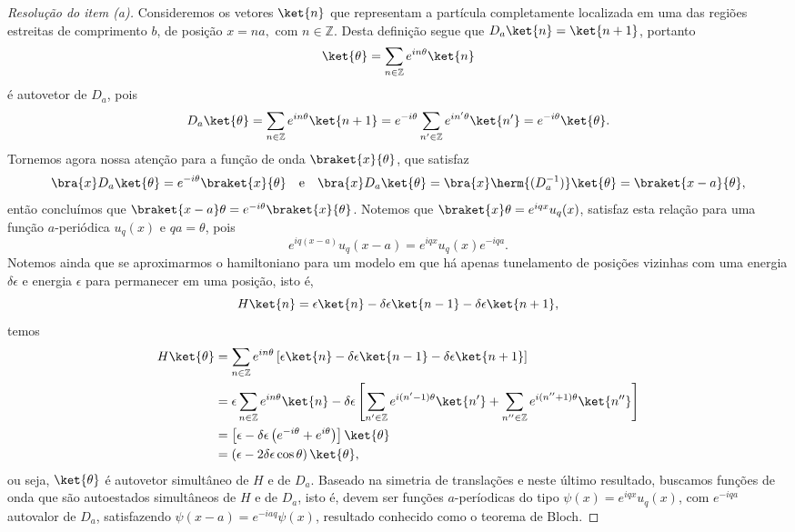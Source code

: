 \begin{proof}[Resolução do item (a)]
    Consideremos os vetores \(\ket{n}\) que representam a partícula completamente localizada em uma das regiões estreitas de comprimento \(b\), de posição \(x = na,\) com \(n \in \mathbb{Z}\). Desta definição segue que \(D_a \ket{n} = \ket{n+1}\), portanto
    \begin{equation*}
        \ket{\theta} = \sum_{n \in \mathbb{Z}} e^{i n \theta} \ket{n}
    \end{equation*}
    é autovetor de \(D_a\), pois
    \begin{equation*}
        D_a \ket{\theta} = \sum_{n \in \mathbb{Z}} e^{i n \theta} \ket{n+1} = e^{-i \theta} \sum_{n' \in \mathbb{Z}} e^{i n'\theta} \ket{n'} = e^{-i\theta} \ket{\theta}.
    \end{equation*}
    Tornemos agora nossa atenção para a função de onda \(\braket{x}{\theta}\), que satisfaz
    \begin{equation*}
        \bra{x}D_a\ket{\theta} = e^{-i\theta} \braket{x}{\theta}\quad\text{e}\quad
        \bra{x}D_a\ket{\theta} = \bra{x}\herm{(D_a^{-1})}\ket{\theta} = \braket{x - a}{\theta},
    \end{equation*}
    então concluímos que \(\braket{x - a}\theta = e^{-i\theta}\braket{x}{\theta}\). Notemos que \(\braket{x}\theta = e^{iqx} u_q(x)\), satisfaz esta relação para uma função \(a\)-periódica \(u_q(x)\) e \(qa = \theta\), pois
    \begin{equation*}
        e^{iq(x - a)} u_q(x - a) = e^{iqx}u_q(x) e^{-iqa}.
    \end{equation*}
    Notemos ainda que se aproximarmos o hamiltoniano para um modelo em que há apenas tunelamento de posições vizinhas com uma energia \(\delta \epsilon\) e energia \(\epsilon\) para permanecer em uma posição, isto é,
    \begin{equation*}
        H\ket{n} = \epsilon \ket{n} - \delta \epsilon \ket{n - 1} - \delta \epsilon \ket{n + 1},
    \end{equation*}
    temos
    \begin{align*}
        H \ket{\theta} &= \sum_{n \in \mathbb{Z}} e^{in\theta} \left[\epsilon \ket{n} - \delta \epsilon \ket{n - 1} - \delta \epsilon \ket{n + 1}\right]\\
                       &= \epsilon \sum_{n \in \mathbb{Z}} e^{in\theta}\ket{n} - \delta \epsilon \left[\sum_{n' \in \mathbb{Z}} e^{i (n' - 1) \theta} \ket{n'} + \sum_{n'' \in \mathbb{Z}} e^{i (n'' + 1)\theta} \ket{n''}\right]\\
                       &= \left[\epsilon  - \delta \epsilon\left(e^{-i \theta} + e^{i\theta}\right)\right]\ket{\theta}\\
                       &= \left(\epsilon - 2\delta \epsilon \cos\theta\right) \ket{\theta},
    \end{align*}
    ou seja, \(\ket{\theta}\) é autovetor simultâneo de \(H\) e de \(D_a\). Baseado na simetria de translações e neste último resultado, buscamos funções de onda que são autoestados simultâneos de \(H\) e de \(D_a\), isto é, devem ser funções \(a\)-períodicas do tipo \(\psi(x) = e^{iqx}u_q(x)\), com \(e^{-iqa}\) autovalor de \(D_a\), satisfazendo \(\psi(x - a) = e^{-iaq}\psi(x)\), resultado conhecido como o teorema de Bloch.
\end{proof}

